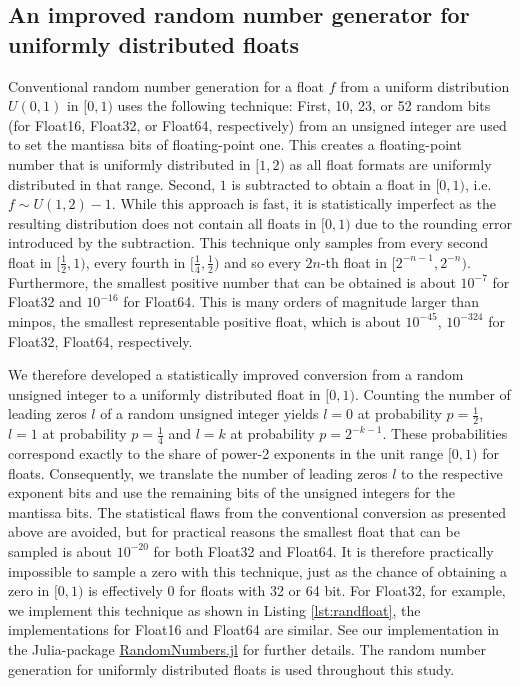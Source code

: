\subsection{An improved random number generator for uniformly distributed floats}
\label{sec:randfloat}

Conventional random number generation for a float $f$ from a uniform distribution $U(0,1)$
in $[0,1)$ uses the following technique: First, 10, 23, or 52 random bits (for Float16, Float32, or Float64, respectively)
from an unsigned integer are used to set the mantissa bits of floating-point one. This creates a floating-point
number that is uniformly distributed in $[1,2)$ as all float formats are uniformly distributed in that range. Second,
$1$ is subtracted to obtain a float in $[0,1)$, i.e. $f \sim U(1,2) - 1$. While this approach is fast, it is statistically
imperfect as the resulting distribution does not contain all floats in $[0,1)$ due to the rounding error introduced
by the subtraction. This technique only samples from every second float in $[\tfrac{1}{2},1)$, every fourth in
$[\tfrac{1}{4},\tfrac{1}{2})$ and so every $2n$-th float in $[2^{-n-1},2^{-n})$. Furthermore, the smallest positive
number that can be obtained is about $10^{-7}$ for Float32 and $10^{-16}$ for Float64. This is many orders of
magnitude larger than minpos, the smallest representable positive float, which is about $10^{-45}$, $10^{-324}$ for
Float32, Float64, respectively.

We therefore developed a statistically improved conversion from a random unsigned integer to a uniformly distributed
float in $[0,1)$. Counting the number of leading zeros $l$ of a random unsigned integer yields $l = 0$ at probability
$p = \tfrac{1}{2}$, $l=1$ at probability $p=\tfrac{1}{4}$ and $l = k$ at probability $p=2^{-k-1}$. These probabilities
correspond exactly to the share of power-2 exponents in the unit range $[0,1)$ for floats.
Consequently, we translate the number of leading zeros $l$  to the respective exponent bits and use the remaining
bits of the unsigned integers for the mantissa bits. The statistical flaws from the conventional conversion as presented
above are avoided, but for practical reasons the smallest float that can be sampled is about $10^{-20}$ for both Float32
and Float64. It is therefore practically impossible to sample a zero with this technique, just as the chance of obtaining a
zero in $[0,1)$ is effectively 0 for floats with 32 or 64 bit. For Float32, for example, we implement this technique as shown
in Listing \ref{lst:randfloat}, the implementations for Float16 and Float64 are similar. See our implementation in the Julia-package
\href{https://github.com/JuliaRandom/RandomNumbers.jl}{RandomNumbers.jl} for further details. The random number generation
for uniformly distributed floats is used throughout this study.


